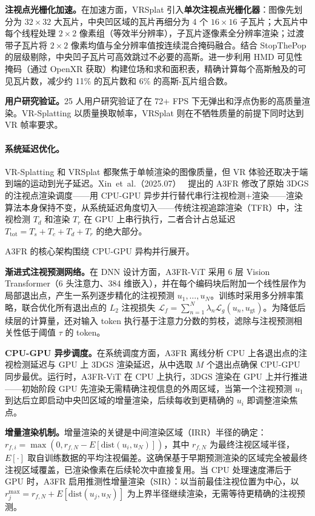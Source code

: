 \textbf{注视点光栅化加速。}在加速方面，VRSplat 引入\textbf{单次注视点光栅化器}：图像先划分为 $32\!\times\!32$ 大瓦片，中央凹区域的瓦片再细分为 4 个 $16\!\times\!16$ 子瓦片；大瓦片中每个线程处理 $2\!\times\!2$ 像素组（等效半分辨率），子瓦片逐像素全分辨率渲染；过渡带子瓦片将 $2\!\times\!2$ 像素均值与全分辨率值按连续混合掩码融合。结合 StopThePop 的层级剔除，中央凹子瓦片可高效跳过不必要的高斯。进一步利用 HMD 可见性掩码（通过 OpenXR 获取）构建位场和求和面积表，精确计算每个高斯触及的可见瓦片数，减少约 11\% 的瓦片数和 6\% 的高斯-瓦片组合数。

\textbf{用户研究验证。}25 人用户研究验证了在 72+ FPS 下无弹出和浮点伪影的高质量渲染。VR-Splatting 以质量换取帧率，VRSplat 则在不牺牲质量的前提下同时达到 VR 帧率要求。

\paragraph{系统延迟优化。}

VR-Splatting 和 VRSplat 都聚焦于单帧渲染的图像质量，但 VR 体验还取决于端到端的运动到光子延迟。Xin~et~al.（2025.07）~\cite{2507_04147} 提出的 A3FR 修改了原始 3DGS 的注视点渲染调度——用 CPU-GPU 异步并行替代串行注视检测+渲染——渲染算法本身保持不变，从系统延迟角度切入——传统注视追踪渲染（TFR）中，注视检测 $T_d$ 和渲染 $T_r$ 在 GPU 上串行执行，二者合计占总延迟 $T_\text{tot} = T_s + T_c + T_d + T_r$ 的绝大部分。

A3FR 的核心架构围绕 CPU-GPU 异构并行展开。

\textbf{渐进式注视预测网络。}在 DNN 设计方面，A3FR-ViT 采用 6 层 Vision Transformer（6 头注意力、384 维嵌入），并在每个编码块后附加一个线性层作为局部退出点，产生一系列逐步精化的注视预测 $u_1, \ldots, u_N$。训练时采用多分辨率策略，联合优化所有退出点的 $L_2$ 注视损失 $\mathcal{L}_f = \sum_{n=1}^N \lambda_n \mathcal{L}_g(u_n, u_\text{gt})$。为降低后续层的计算量，还对输入 token 执行基于注意力分数的剪枝，滤除与注视预测相关性低于阈值 $\tau$ 的 token。

\textbf{CPU-GPU 异步调度。}在系统调度方面，A3FR 离线分析 CPU 上各退出点的注视检测延迟与 GPU 上 3DGS 渲染延迟，从中选取 $M$ 个退出点确保 CPU-GPU 同步最优。运行时，A3FR-ViT 在 CPU 上执行，3DGS 渲染在 GPU 上并行推进——初始阶段 GPU 先渲染无需精确注视信息的外周区域，当第一个注视预测 $u_1$ 到达后立即启动中央凹区域的增量渲染，后续每收到更精确的 $u_i$ 即调整渲染焦点。

\textbf{增量渲染机制。}增量渲染的关键是中间渲染区域（IRR）半径的确定：$r_{f,i} = \max(0, r_{f,N} - E[\text{dist}(u_i, u_N)])$，其中 $r_{f,N}$ 为最终注视区域半径，$E[\cdot]$ 取自训练数据的平均注视偏差。这确保基于早期预测渲染的区域完全被最终注视区域覆盖，已渲染像素在后续轮次中直接复用。当 CPU 处理速度滞后于 GPU 时，A3FR 启用推测性增量渲染（SIR）：以当前最佳注视位置为中心，以 $r_j^\text{max} = r_{f,N} + E[\text{dist}(u_j, u_N)]$ 为上界半径继续渲染，无需等待更精确的注视预测。

